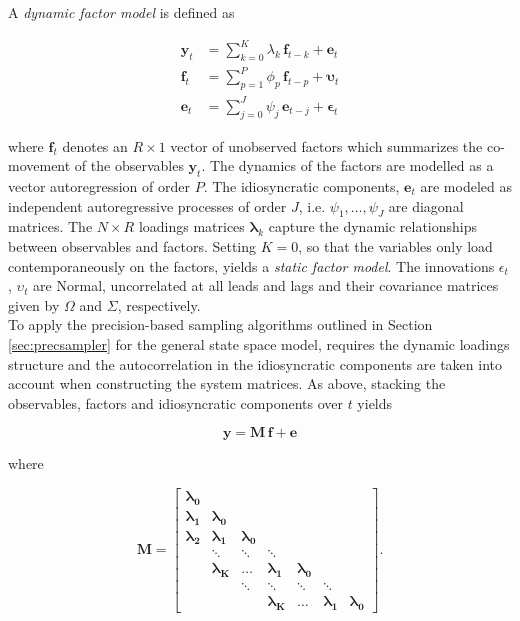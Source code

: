 \documentclass[notitlepage,a4paper,12pt]{article}
\begin{document}
A \textit{dynamic factor model} is defined as

\begin{subequations}
    \label{eqn:factormodel}
    \begin{align}
        \mathbf{y}_t &= \sum_{k=0}^K \lambda_k \, \mathbf{f}_{t-k} + \mathbf{e}_t \\
        \mathbf{f}_t &= \sum_{p=1}^P \phi_p \, \mathbf{f}_{t-p} + \boldsymbol{\upsilon}_t \\
        \mathbf{e}_t &= \sum_{j=0}^J \psi_j \, \mathbf{e}_{t-j} + \boldsymbol{\epsilon}_t 
    \end{align}
\end{subequations}

where $\mathbf{f}_t$ denotes an $R \times 1$ vector of unobserved factors which summarizes the co-movement of the observables $\mathbf{y}_t$. The dynamics of the factors are modelled as a vector autoregression of order $P$. The idiosyncratic components, $\mathbf{e}_t$ are modeled as independent autoregressive processes of order $J$, i.e. $\psi_1, \dots, \psi_J$ are diagonal matrices. The $N \times R$ loadings matrices $\mathbf{\lambda}_k$ capture the dynamic relationships between observables and factors. Setting $K=0$, so that the variables only load contemporaneously on the factors, yields a \textit{static factor model}. The innovations $\epsilon_t$, $\upsilon_t$ are Normal, uncorrelated at all leads and lags and their covariance matrices given by $\Omega$ and $\Sigma$, respectively. \\

To apply the precision-based sampling algorithms outlined in Section \ref{sec:precsampler} for the general state space model, requires the dynamic loadings structure and the autocorrelation in the idiosyncratic components are taken into account when constructing the system matrices. As above, stacking the observables, factors and idiosyncratic components over $t$ yields 

\begin{equation}
    \mathbf{y} = \mathbf{M} \, \mathbf{f} + \mathbf{e}
\end{equation} 

\noindent where 

$$
\mathbf{M}
=
\begin{bmatrix}
    \boldsymbol{\lambda_0} &   \\
    \boldsymbol{\lambda_1} & \boldsymbol{\lambda_0}   \\
    \boldsymbol{\lambda_2} & \boldsymbol{\lambda_1} & \boldsymbol{\lambda_0} \\
     & \ddots & \ddots & \ddots \\
     & \boldsymbol{\lambda_K} &\dots & \boldsymbol{\lambda_1} & \boldsymbol{\lambda_0}
     &  \\
     & & \ddots & \ddots & \ddots & \ddots \\
    & & & \boldsymbol{\lambda_K} &\dots & \boldsymbol{\lambda_1} & \boldsymbol{\lambda_0}
\end{bmatrix}.
$$
\end{document}
